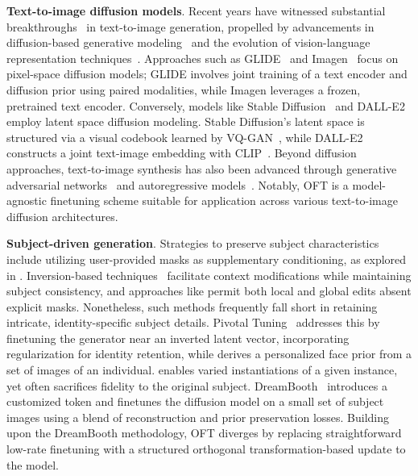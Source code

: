 \textbf{Text-to-image diffusion models}. Recent years have witnessed substantial breakthroughs~\cite{saharia2022photorealistic,ramesh2022hierarchical,rombach2022high,gu2022vector,nichol2022glide} in text-to-image generation, propelled by advancements in diffusion-based generative modeling~\cite{ho2020denoising,song2021score,song2021denoising,dhariwal2021diffusion} and the evolution of vision-language representation techniques~\cite{su2020vlbert,lu2019vilbert,radford2021learning,wang2021simvlm,li2022blip,li2023blip,alayrac2022flamingo,schuhmann2022laion}. Approaches such as GLIDE~\cite{nichol2022glide} and Imagen~\cite{saharia2022photorealistic} focus on pixel-space diffusion models; GLIDE involves joint training of a text encoder and diffusion prior using paired modalities, while Imagen leverages a frozen, pretrained text encoder. Conversely, models like Stable Diffusion~\cite{rombach2022high} and DALL-E2~\cite{ramesh2022hierarchical} employ latent space diffusion modeling. Stable Diffusion’s latent space is structured via a visual codebook learned by VQ-GAN~\cite{esser2021taming}, while DALL-E2 constructs a joint text-image embedding with CLIP~\cite{radford2021learning}. Beyond diffusion approaches, text-to-image synthesis has also been advanced through generative adversarial networks~\cite{reed2016generative,zhang2017stackgan,xu2018attngan,li2019controllable} and autoregressive models~\cite{ramesh2021zero,ding2021cogview,wu2022nuwa,yuscaling}. Notably, OFT is a model-agnostic finetuning scheme suitable for application across various text-to-image diffusion architectures.

\textbf{Subject-driven generation}. Strategies to preserve subject characteristics include utilizing user-provided masks as supplementary conditioning, as explored in \cite{avrahami2022blended,nichol2022glide}. Inversion-based techniques~\cite{choi2021ilvr,dhariwal2021diffusion,ramesh2022hierarchical,gal2022image} facilitate context modifications while maintaining subject consistency, and approaches like \cite{hertz2022prompt} permit both local and global edits absent explicit masks. Nonetheless, such methods frequently fall short in retaining intricate, identity-specific subject details. Pivotal Tuning~\cite{roich2022pivotal} addresses this by finetuning the generator near an inverted latent vector, incorporating regularization for identity retention, while \cite{nitzan2022mystyle} derives a personalized face prior from a set of images of an individual. \cite{casanova2021instance} enables varied instantiations of a given instance, yet often sacrifices fidelity to the original subject. DreamBooth~\cite{ruiz2023dreambooth} introduces a customized token and finetunes the diffusion model on a small set of subject images using a blend of reconstruction and prior preservation losses. Building upon the DreamBooth methodology, OFT diverges by replacing straightforward low-rate finetuning with a structured orthogonal transformation-based update to the model.

